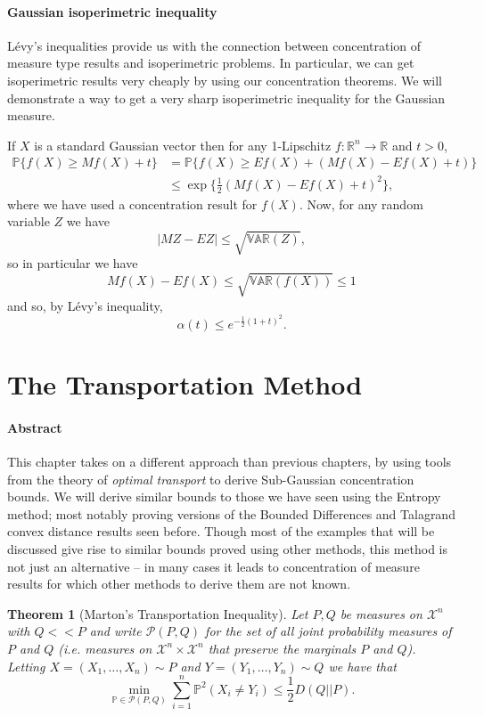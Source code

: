 \documentclass[reqno]{amsproc}
\newtheorem{theorem}{Theorem}
\newcommand{\R}{\mathbb{R}}
\renewcommand{\P}{\mathbb{P}} %
\newcommand{\var}{\mathbb{VAR}} %
\begin{document}
\paragraph{ \bf Gaussian isoperimetric inequality} \label{rmk:iso}
	L\'evy's inequalities provide us with the connection between concentration of measure type results and isoperimetric problems.
	In particular, we can get isoperimetric results very cheaply by using our concentration theorems.
	We will demonstrate a way to get a very sharp isoperimetric inequality for the Gaussian measure.

	If $X$ is a standard Gaussian vector then for any 1-Lipschitz $f: \R^n \to \R$ and $t > 0$,
	\begin{align*}
	\P \{ f(X) \geq Mf(X) + t \} &= \P \{ f(X) \geq Ef(X) + (Mf(X) - Ef(X) + t) \} \\
	& \leq \exp \bigg\{ \frac{1}{2}(Mf(X) - Ef(X) + t)^2\bigg\},
	\end{align*}
	where we have used a concentration result for $f(X)$. Now, for any random variable $Z$ we have
	\[|MZ - EZ| \leq \sqrt{\var(Z)},\]
	so in particular we have
	\[ Mf(X) - Ef(X) \leq \sqrt{\var(f(X))} \leq 1\]
	and so, by L\'evy's inequality,
	\[ \alpha(t) \leq e^{-\frac{1}{2}(1+t)^2}. \]


\section{The Transportation Method}
\label{sec:transp}
	\paragraph{\textbf{Abstract}}
	This chapter takes on a different approach than previous chapters, by using tools from the theory of \textit{optimal transport} to derive Sub-Gaussian concentration bounds.
	We will derive similar bounds to those we have seen using the Entropy method; most notably proving versions of the Bounded Differences and Talagrand convex distance results seen before.
	Though most of the examples that will be discussed give rise to similar bounds proved using other methods,
	this method is not just an alternative -- in many cases it leads to concentration of measure results for which other methods to derive them are not known.

	\begin{theorem}[Marton's Transportation Inequality]
	\label{thm:marton}
		Let $P,Q$ be measures on $\mathcal{X}^n$ with $Q << P$ and write $\mathcal{P}(P,Q)$ for the set of all joint probability measures of $P$ and $Q$
		(i.e. measures on $\mathcal{X}^n \times \mathcal{X}^n$ that preserve the marginals $P$ and $Q$).
		Letting $X = (X_1,\dots,X_n) \sim P$ and $ Y = (Y_1,\dots,Y_n) \sim Q$ we have that
		$$ \min\limits_{\P \in \mathcal{P}(P,Q)} \sum\limits_{i=1}^n \P^2(X_i \ne Y_i) \leq \frac{1} {2}D(Q||P).$$
	\end{theorem}
\end{document}
